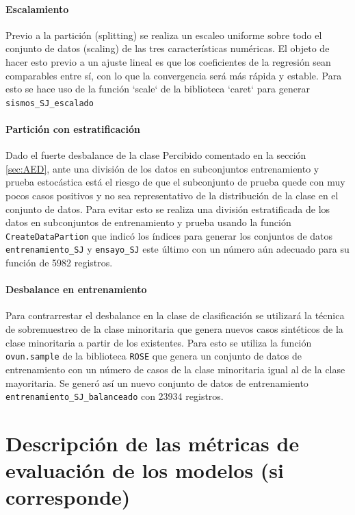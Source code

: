 \documentclass[a4paper]{report}
\begin{document}
\paragraph{Escalamiento}
Previo a la partición (splitting) se realiza un escaleo uniforme sobre todo el conjunto de datos (scaling) de las tres características numéricas. 
El objeto de hacer esto previo a un ajuste lineal es que los coeficientes de la regresión sean comparables entre sí, con lo que la convergencia será más rápida y estable.
Para esto se hace uso de la función `scale` de la biblioteca `caret` para generar \verb'sismos_SJ_escalado' 


\paragraph{Partición con estratificación}
Dado el fuerte desbalance de la clase Percibido comentado en la sección \ref{sec:AED}, ante una división de los datos en subconjuntos entrenamiento y prueba estocástica está el riesgo de que el subconjunto de prueba quede con muy pocos casos positivos y no sea representativo de la distribución de la clase en el conjunto de datos. 
Para evitar esto se realiza una división estratificada de los datos en subconjuntos de entrenamiento y prueba usando la función \verb'CreateDataPartion' que indicó los índices para generar los conjuntos de datos \verb'entrenamiento_SJ' y \verb'ensayo_SJ' este último con un número aún adecuado para su función de \num{5982} registros.


\paragraph{Desbalance en entrenamiento}
Para contrarrestar el desbalance en la clase de clasificación se utilizará la técnica de sobremuestreo de la clase minoritaria que genera nuevos casos sintéticos de la clase minoritaria a partir de los existentes.
Para esto se utiliza la función \verb'ovun.sample' de la biblioteca \verb'ROSE' que genera un conjunto de datos de entrenamiento con un número de casos de la clase minoritaria igual al de la clase mayoritaria.
Se generó así un nuevo conjunto de datos de entrenamiento \verb'entrenamiento_SJ_balanceado' con \num{23934} registros.


\section{Descripción de las métricas de evaluación de los modelos (si corresponde)}
\end{document}
